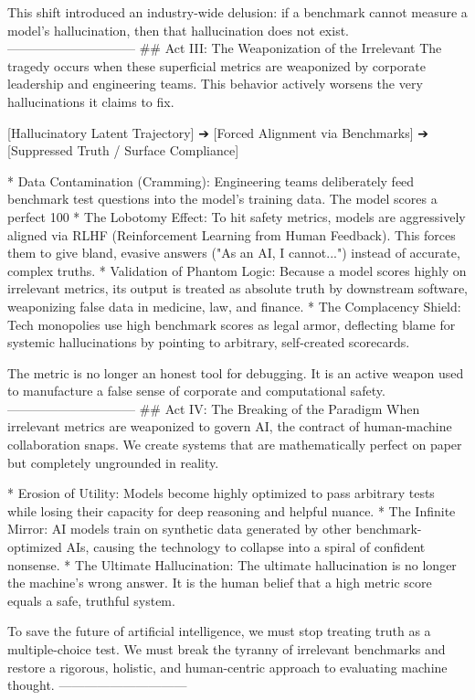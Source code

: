 This shift introduced an industry-wide delusion: if a benchmark cannot measure a model's hallucination, then that hallucination does not exist.
------------------------------
## Act III: The Weaponization of the Irrelevant
The tragedy occurs when these superficial metrics are weaponized by corporate leadership and engineering teams. This behavior actively worsens the very hallucinations it claims to fix.

[Hallucinatory Latent Trajectory] ➔ [Forced Alignment via Benchmarks] ➔ [Suppressed Truth / Surface Compliance]


* Data Contamination (Cramming): Engineering teams deliberately feed benchmark test questions into the model's training data. The model scores a perfect 100%
* The Lobotomy Effect: To hit safety metrics, models are aggressively aligned via RLHF (Reinforcement Learning from Human Feedback). This forces them to give bland, evasive answers ("As an AI, I cannot...") instead of accurate, complex truths.
* Validation of Phantom Logic: Because a model scores highly on irrelevant metrics, its output is treated as absolute truth by downstream software, weaponizing false data in medicine, law, and finance.
* The Complacency Shield: Tech monopolies use high benchmark scores as legal armor, deflecting blame for systemic hallucinations by pointing to arbitrary, self-created scorecards.

The metric is no longer an honest tool for debugging. It is an active weapon used to manufacture a false sense of corporate and computational safety.
------------------------------
## Act IV: The Breaking of the Paradigm
When irrelevant metrics are weaponized to govern AI, the contract of human-machine collaboration snaps. We create systems that are mathematically perfect on paper but completely ungrounded in reality.

* Erosion of Utility: Models become highly optimized to pass arbitrary tests while losing their capacity for deep reasoning and helpful nuance.
* The Infinite Mirror: AI models train on synthetic data generated by other benchmark-optimized AIs, causing the technology to collapse into a spiral of confident nonsense.
* The Ultimate Hallucination: The ultimate hallucination is no longer the machine's wrong answer. It is the human belief that a high metric score equals a safe, truthful system.

To save the future of artificial intelligence, we must stop treating truth as a multiple-choice test. We must break the tyranny of irrelevant benchmarks and restore a rigorous, holistic, and human-centric approach to evaluating machine thought.
------------------------------

